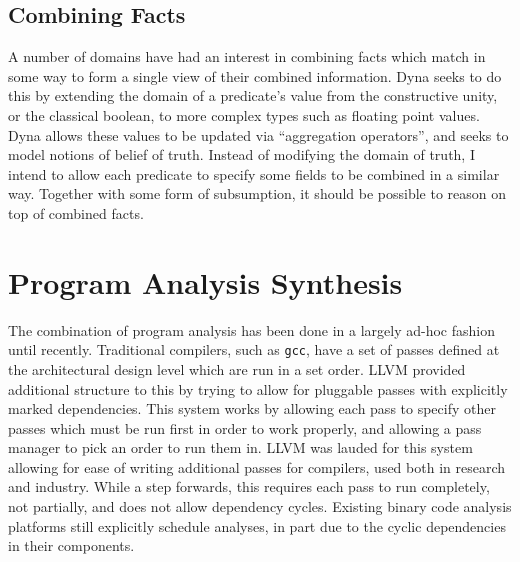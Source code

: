 \subsection{Combining Facts}
A number of domains have had an interest in combining facts which match in some way to form a single view of their combined information.
Dyna\cite{dyna} seeks to do this by extending the domain of a predicate's value from the constructive unity, or the classical boolean, to more complex types such as floating point values.
Dyna allows these values to be updated via ``aggregation operators'', and seeks to model notions of belief of truth.
Instead of modifying the domain of truth, I intend to allow each predicate to specify some fields to be combined in a similar way.
Together with some form of subsumption, it should be possible to reason on top of combined facts.
\section{Program Analysis Synthesis}
The combination of program analysis has been done in a largely ad-hoc fashion until recently.
Traditional compilers, such as \texttt{gcc}, have a set of passes defined at the architectural design level which are run in a set order.
LLVM\cite{llvm} provided additional structure to this by trying to allow for pluggable passes with explicitly marked dependencies.
This system works by allowing each pass to specify other passes which must be run first in order to work properly, and allowing a pass manager to pick an order to run them in.
LLVM was lauded for this system allowing for ease of writing additional passes for compilers, used both in research and industry.
While a step forwards, this requires each pass to run completely, not partially, and does not allow dependency cycles.
Existing binary code analysis platforms\cite{jakstab,bap} still explicitly schedule analyses, in part due to the cyclic dependencies in their components.
